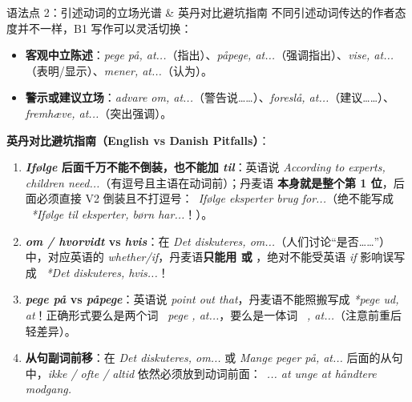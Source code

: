 \begin{grammatikbox}{语法点 2：引述动词的立场光谱 \& 英丹对比避坑指南}
不同引述动词传达的作者态度并不一样，B1 写作可以灵活切换：
\begin{itemize}
  \item \textbf{客观中立陈述}：\textit{pege på, at...}（指出）、\textit{påpege, at...}（强调指出）、\textit{vise, at...}（表明/显示）、\textit{mener, at...}（认为）。
  \item \textbf{警示或建议立场}：\textit{advare om, at...}（警告说……）、\textit{foreslå, at...}（建议……）、\textit{fremhæve, at...}（突出强调）。
\end{itemize}

\vspace{0.3em}
\textbf{英丹对比避坑指南（English vs Danish Pitfalls）}：
\begin{enumerate}
  \item \textbf{\textit{Ifølge} 后面千万不能不倒装，也不能加 \textit{til}}：英语说 \textit{According to experts, children need...}（有逗号且主语在动词前）；丹麦语  \textbf{本身就是整个第 1 位}，后面必须直接 V2 倒装且不打逗号：\ \textit{Ifølge eksperter  brug for...}（绝不能写成 \ \textit{*Ifølge til eksperter, børn har...}！）。
  \item \textbf{\textit{om / hvorvidt} vs \textit{hvis}}：在 \textit{Det diskuteres, om...}（人们讨论“是否……”）中，对应英语的 \textit{whether/if}，丹麦语\textbf{只能用  或 }，绝对不能受英语 \textit{if} 影响误写成 \ \textit{*Det diskuteres, hvis...}！
  \item \textbf{\textit{pege på} vs \textit{påpege}}：英语说 \textit{point out that}，丹麦语不能照搬写成 \textit{*pege ud, at}！正确形式要么是两个词 \ \textit{pege , at...}，要么是一体词 \ \textit{, at...}（注意前重后轻差异）。
  \item \textbf{从句副词前移}：在 \textit{Det diskuteres, om...} 或 \textit{Mange peger på, at...} 后面的从句中，\textit{ikke / ofte / altid} 依然必须放到动词前面：\ \textit{... at unge  at håndtere modgang.}
\end{enumerate}
\end{grammatikbox}


